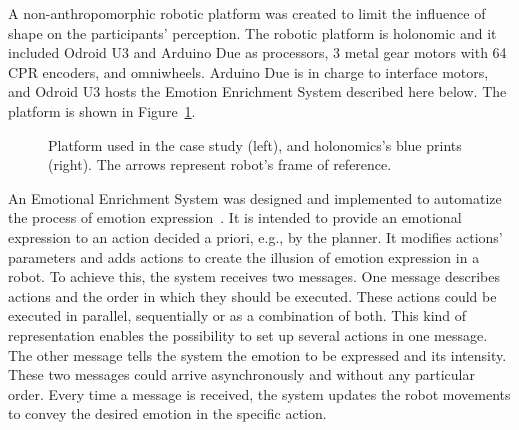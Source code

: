 A non-anthropomorphic robotic platform was created to limit the influence of shape on the participants' perception. The robotic platform is holonomic and it included Odroid U3 and Arduino Due as processors, 3 metal gear motors with 64 CPR encoders, and omniwheels. Arduino Due is in charge to interface motors, and Odroid U3 hosts the Emotion Enrichment System described here below.
The platform is shown in Figure~\ref{fig:Robot}.

\begin{figure}[t]
\centering%
\hspace{2mm}
\caption{Platform used in the case study (left), and holonomics's blue prints (right). The arrows represent robot's frame of reference.
\label{fig:Robot}}
\end{figure}

An Emotional Enrichment System was designed and implemented to automatize the process of emotion expression~\cite{Angel2017}. It is intended to provide an emotional expression to an action decided a priori, e.g., by the planner. It modifies actions' parameters and adds actions to create the illusion of emotion expression in a robot. To achieve this, the system receives two messages. One message describes actions and the order in which they should be executed. These actions could be executed in parallel, sequentially or as a combination of both. This kind of representation enables the possibility to set up several actions in one message. The other message tells the system the emotion to be expressed and its intensity. These two messages could arrive asynchronously and without any particular order. Every time a message is received, the system updates the robot movements to convey the desired emotion in the specific action.
